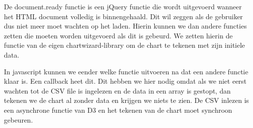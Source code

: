 De document.ready functie is een jQuery functie die wordt uitgevoerd wanneer het HTML document volledig is binnengehaald. Dit wil zeggen als de gebruiker dus niet meer moet wachten op het laden. Hierin kunnen we dan andere functies zetten die moeten worden uitgevoerd als dit is gebeurd. We zetten hierin de functie van de eigen chartwizard-library om de chart te tekenen met zijn initiele data.

In javascript kunnen we eender welke functie uitvoeren na dat een andere functie klaar is. Een callback heet dit. Dit hebben we hier nodig omdat als we niet eerst wachten tot de CSV file is ingelezen en de data in een array is gestopt, dan tekenen we de chart al zonder data en krijgen we niets te zien. De CSV inlezen is een asynchrone functie van D3 en het tekenen van de chart moet synchroon gebeuren.

